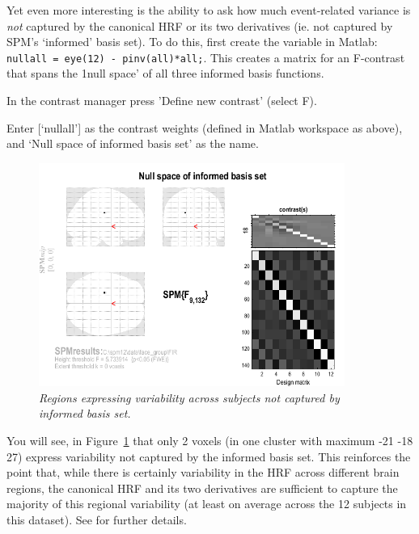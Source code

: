 Yet even more interesting is the ability to ask how much event-related variance is {\em not} captured by the canonical HRF or its two derivatives (ie. not captured by SPM's `informed' basis set). To do this, first create the variable in Matlab: \verb!nullall = eye(12) - pinv(all)*all;!.
This creates a matrix for an F-contrast that spans the 1null space' of all three informed basis functions.
\bi
\item{In the contrast manager press 'Define new contrast' (select F).}
\item{Enter [`nullall'] as the contrast weights (defined in Matlab workspace
	as above), and `Null space of informed basis set' as the name.}
\ei
\begin{figure}
\begin{center}
\includegraphics[width=100mm]{nullall}
\caption{\em Regions expressing variability across subjects not captured by informed basis set. \label{nullall}}
\end{center}
\end{figure}
You will see, in Figure~\ref{nullall} that only 2 voxels (in one cluster with maximum -21 -18 27) express variability not captured by the informed basis set. This reinforces the point that, while there is certainly variability in the HRF across different brain regions, the canonical HRF and its two derivatives are sufficient to capture the majority of this regional variability (at least on average across the 12 subjects in this dataset). See \cite{rnah_basis} for further details.




